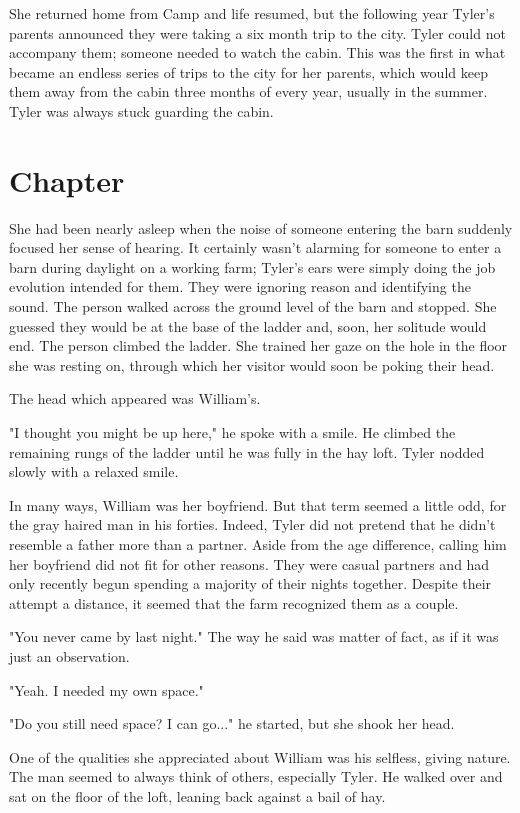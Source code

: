\documentclass[courier]{sffms}
\begin{document}
She returned home from Camp and life resumed,
but the following year Tyler's parents announced
they were taking a six month trip to the city. Tyler
could not accompany them; someone needed
to watch the cabin. This was the first in what
became an endless series of trips to the city for
her parents, which would keep them away from
the cabin three months of every year, usually in the
summer. Tyler was always stuck guarding the cabin.

\chapter{Chapter}
She had been nearly asleep when the noise of
someone entering the barn suddenly focused her
sense of hearing. It certainly wasn't alarming for 
someone to enter a barn during daylight on a
working farm; Tyler's ears were simply doing the
job evolution intended for them. They were
ignoring reason and identifying the sound.
The person walked across the ground level
of the barn and stopped. She guessed they would
be at the base of the ladder and, soon, her
solitude would end. The person climbed the ladder.
She trained her gaze on the hole in the floor
she was resting on, through which her visitor
would soon be poking their head.

The head which appeared was William's.

"I thought you might be up here," he spoke with a
smile. He climbed the remaining rungs of the ladder
until he was fully in the hay loft. Tyler nodded slowly
with a relaxed smile.

In many ways, William was her boyfriend. But that
term seemed a little odd, for the gray haired man
in his forties. Indeed, Tyler did not pretend that he
didn't resemble a father more than a partner. Aside
from the age difference, calling him her boyfriend
did not fit for other reasons. They were casual
partners and had only recently begun spending
a majority of their nights together. Despite their attempt
a distance, it seemed that the farm recognized them
as a couple.

"You never came by last night." The way he said was
matter of fact, as if it was just an observation.

"Yeah. I needed my own space."

"Do you still need space? I can go..." he started, but
she shook her head.

One of the qualities she appreciated about William
was his selfless, giving nature. The man seemed to
always think of others, especially Tyler. He walked
over and sat on the floor of the loft, leaning back
against a bail of hay.
\end{document}
